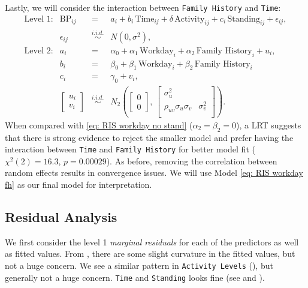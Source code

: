 \documentclass[12pt,twoside,letterpaper]{article}
\theoremstyle{definition}
\theoremstyle{definition}
\begin{document}
Lastly, we will consider the interaction between \texttt{Family History} and \texttt{Time}:
\begin{equation}\label{eq: RIS workday fh}
    \begin{array}{rrcll}
        \text{Level 1}: & \text{BP}_{ij} &=& a_i + b_i\, \text{Time}_{ij} + \delta \, \text{Activity}_{ij} + c_i\, \text{Standing}_{ij} + \epsilon_{ij}, \\[0.5ex]
         & \epsilon_{ij} &\overset{i.i.d.}{\sim}& N(0, \sigma^2), \\[0.5ex]
        \text{Level 2}: & a_i &=& \alpha_0 + \alpha_1\, \text{Workday}_i + \alpha_2\, \text{Family History}_i + u_i, \\[0.5ex]
        & b_i &=& \beta_0 + \beta_1\, \text{Workday}_i+ \beta_2\, \text{Family History}_i \\[0.5ex]
        & c_i &=& \gamma_0 + v_i, \\[1ex]
         & \begin{bmatrix} u_i \\ v_i 
         \end{bmatrix} &\overset{i.i.d.}{\sim}& N_2\left(\begin{bmatrix} 0 \\ 0 \end{bmatrix},\, \begin{bmatrix} \sigma_u^2 &\\ 
         \rho_{uv}\sigma_u\sigma_v & \sigma_v^2\\
         \end{bmatrix} \right).
    \end{array}
\end{equation}
When compared with \ref{eq: RIS workday no stand} ($\alpha_2 = \beta_2 = 0$), a LRT suggests that there is strong evidence to reject the smaller model and prefer having the interaction between \texttt{Time} and \texttt{Family History} for better model fit ($\chi^2 (2) = 16.3$, $p = 0.00029$). As before, removing the correlation between random effects results in convergence issues. We will use Model \ref{eq: RIS workday fh} as our final model for interpretation.

\subsection{Residual Analysis}\label{sec: resid}

We first consider the level 1 \emph{marginal residuals} for each of the predictors as well as fitted values. From , there are some slight curvature in the fitted values, but not a huge concern. We see a similar pattern in \texttt{Activity Levels} (), but generally not a huge concern. \texttt{Time} and \texttt{Standing} looks fine (see  and ). 
\end{document}
